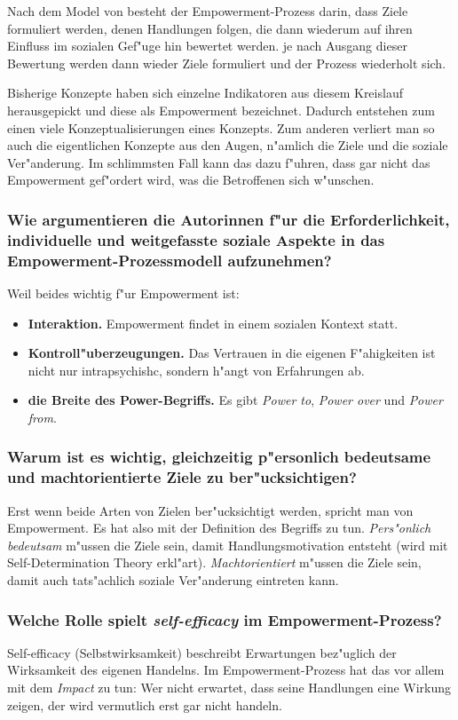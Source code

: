 Nach dem Model von \textcite{cattaneo_process_2010} besteht der Empowerment-Prozess darin, dass Ziele formuliert werden, denen Handlungen folgen, die dann wiederum auf ihren Einfluss im sozialen Gef"uge hin bewertet werden. je nach Ausgang dieser Bewertung werden dann wieder Ziele formuliert und der Prozess wiederholt sich.

Bisherige Konzepte haben sich einzelne Indikatoren aus diesem Kreislauf herausgepickt und diese als Empowerment bezeichnet. Dadurch entstehen zum einen viele Konzeptualisierungen eines Konzepts. Zum anderen verliert man so auch die eigentlichen Konzepte aus den Augen, n"amlich die Ziele und die soziale Ver"anderung. Im schlimmsten Fall kann das dazu f"uhren, dass gar nicht das Empowerment gef"ordert wird, was die Betroffenen sich w"unschen.
\subsubsection{Wie argumentieren die Autorinnen f"ur die Erforderlichkeit, individuelle und weitgefasste soziale Aspekte in das Empowerment-Prozessmodell aufzunehmen?}
Weil beides wichtig f"ur Empowerment ist:
\begin{itemize}
        \item \textbf{Interaktion.} Empowerment findet in einem sozialen Kontext statt.
        \item \textbf{Kontroll"uberzeugungen.} Das Vertrauen in die eigenen F"ahigkeiten ist nicht nur intrapsychishc, sondern h"angt von Erfahrungen ab.
        \item \textbf{die Breite des Power-Begriffs.} Es gibt \emph{Power to}, \emph{Power over} und \emph{Power from}.
\end{itemize}

\subsubsection{Warum ist es wichtig, gleichzeitig p"ersonlich bedeutsame und machtorientierte Ziele zu ber"ucksichtigen?}
Erst wenn beide Arten von Zielen ber"ucksichtigt werden, spricht man von Empowerment. Es hat also mit der Definition des Begriffs zu tun. \emph{Pers"onlich bedeutsam} m"ussen die Ziele sein, damit Handlungsmotivation entsteht (wird mit Self-Determination Theory erkl"art). \emph{Machtorientiert} m"ussen die Ziele sein, damit auch tats"achlich soziale Ver"anderung eintreten kann.

\subsubsection{Welche Rolle spielt \emph{self-efficacy} im Empowerment-Prozess?}
Self-efficacy (Selbstwirksamkeit) beschreibt Erwartungen bez"uglich der Wirksamkeit des eigenen Handelns. Im Empowerment-Prozess hat das vor allem mit dem \emph{Impact} zu tun: Wer nicht erwartet, dass seine Handlungen eine Wirkung zeigen, der wird vermutlich erst gar nicht handeln.

